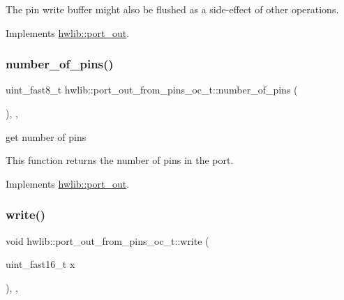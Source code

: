 The pin write buffer might also be flushed as a side-\/effect of other operations. 

Implements \hyperlink{classhwlib_1_1port__out_aff7c8d768ec0b7f3d738a47ef1a4bbfe}{hwlib\+::port\+\_\+out}.

\mbox{\label{classhwlib_1_1port__out__from__pins__oc__t_adcf78d299959f17d7515f7290206df12}} 
\subsubsection{\texorpdfstring{number\+\_\+of\+\_\+pins()}{number\_of\_pins()}}
{\footnotesize\ttfamily uint\+\_\+fast8\+\_\+t hwlib\+::port\+\_\+out\+\_\+from\+\_\+pins\+\_\+oc\+\_\+t\+::number\+\_\+of\+\_\+pins (\begin{DoxyParamCaption}{ }\end{DoxyParamCaption})\hspace{0.3cm}{\ttfamily [inline]}, {\ttfamily [override]}, {\ttfamily [virtual]}}





get number of pins

This function returns the number of pins in the port. 

Implements \hyperlink{classhwlib_1_1port__out_a8593e2ff755b938797defb06c1e085df}{hwlib\+::port\+\_\+out}.

\mbox{\label{classhwlib_1_1port__out__from__pins__oc__t_ab146f9cb459f7a3b09bd2beae0948210}} 
\subsubsection{\texorpdfstring{write()}{write()}}
{\footnotesize\ttfamily void hwlib\+::port\+\_\+out\+\_\+from\+\_\+pins\+\_\+oc\+\_\+t\+::write (\begin{DoxyParamCaption}\item[{uint\+\_\+fast16\+\_\+t}]{x }\end{DoxyParamCaption})\hspace{0.3cm}{\ttfamily [inline]}, {\ttfamily [override]}, {\ttfamily [virtual]}}







